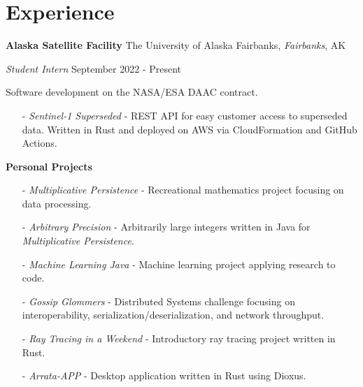 ﻿\section{Experience}

\textbf{Alaska Satellite Facility}
\hfill
The University of Alaska Fairbanks, \textit{Fairbanks}, AK

\textit{Student Intern}
\hfill
{September 2022 - Present}

Software development on the NASA/ESA DAAC contract.

\begin{itemize}
    \item [-] \textit{Sentinel-1 Superseded} - REST API for easy customer access to superseded data. Written in Rust and deployed on AWS via CloudFormation and GitHub Actions.
    
\end{itemize}

\bigbreak

\textbf{Personal Projects}
\begin{itemize}\setlength\itemsep{0.05cm}
    \item [-] \textit{Multiplicative Persistence} - Recreational mathematics project focusing on data processing.
    \item [-] \textit{Arbitrary Precision} - Arbitrarily large integers written in Java for \textit{Multiplicative Persistence}.
    \item [-] \textit{Machine Learning Java} - Machine learning project applying research to code.
    \item [-] \textit{Gossip Glommers} - Distributed Systems challenge focusing on interoperability, serialization/deserialization, and network throughput.
    \item [-] \textit{Ray Tracing in a Weekend} - Introductory ray tracing project written in Rust.
    \item [-] \textit{Arrata-APP} - Desktop application written in Rust using Dioxus.
\end{itemize}